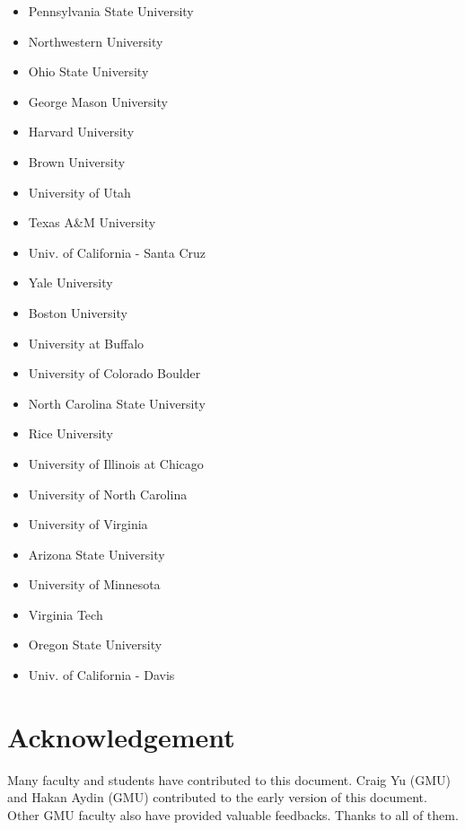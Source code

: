 \documentclass[10pt]{article}
\begin{document}
\begin{itemize}
\item Pennsylvania State University 
\item Northwestern University 
\item Ohio State University 
\item George Mason University 
\item Harvard University  
\item Brown University  
\item University of Utah 
\item Texas A\&M University
\item Univ. of California - Santa Cruz  
\item Yale University  
\item Boston University 
\item University at Buffalo
\item University of Colorado Boulder 
\item North Carolina State University
\item Rice University 
\item University of Illinois at Chicago  
\item University of North Carolina 
\item University of Virginia 
\item Arizona State University 
\item University of Minnesota 
\item Virginia Tech  
\item  Oregon State University  
\item Univ. of California - Davis
\end{itemize}        


\section{Acknowledgement}
Many faculty and students have contributed to this document.
Craig Yu (GMU) and Hakan Aydin (GMU) contributed to the early version of this document. Other GMU faculty also have provided valuable feedbacks.  Thanks to all of them.


\newpage
\end{document}
